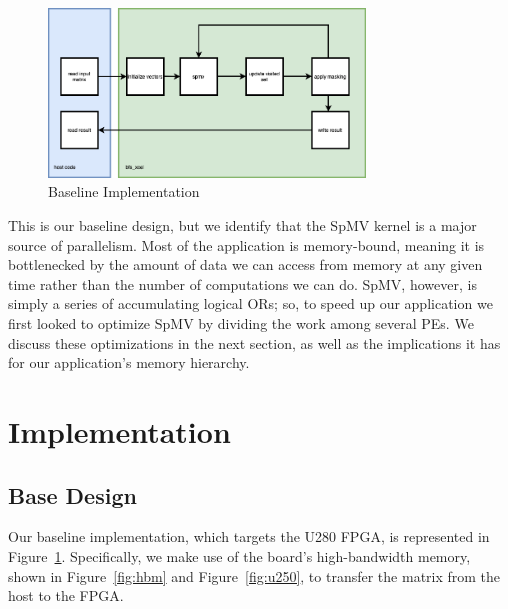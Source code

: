 \documentclass[10pt]{article}
\begin{document}
\begin{figure}[h!]
  \centering
  \includegraphics[width=0.75\textwidth]{bfs_unopt.png}
  \caption{Baseline Implementation}
  \label{fig:baseline_impl}
\end{figure}

This is our baseline design, but we identify that the SpMV kernel is a major
source of parallelism. Most of the application is memory-bound, meaning it is
bottlenecked by the amount of data we can access from memory at any given time
rather than the number of computations we can do. SpMV, however, is simply a
series of accumulating logical ORs; so, to speed up our application we first
looked to optimize SpMV by dividing the work among several PEs. We discuss these
optimizations in the next section, as well as the implications it has for our
application's memory hierarchy.

\section{Implementation}

\subsection{Base Design}
Our baseline implementation, which targets the U280 FPGA, is represented in
Figure~\ref{fig:baseline_impl}. Specifically, we make use of the board's high-bandwidth memory, shown in
Figure~\ref{fig:hbm} and Figure~\ref{fig:u250}, to transfer the matrix from the host to the FPGA.
\end{document}
